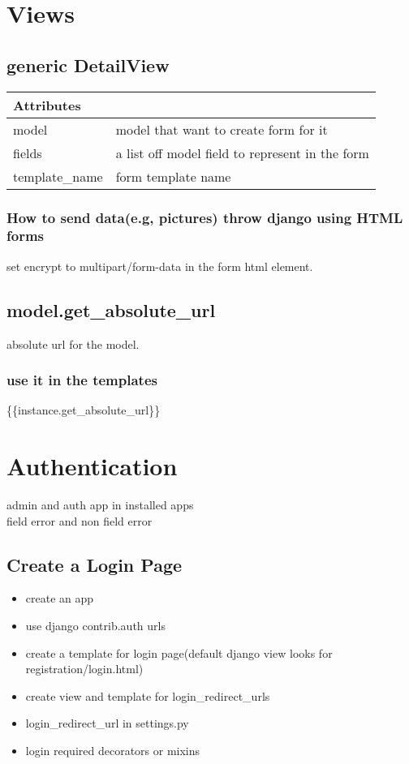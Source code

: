 \documentclass{article}
\begin{document}
	\section{Views}
		\subsection{generic DetailView}
			\begin{tabular}{ll}
				\hline
				Attributes & \\ \hline
				model & model that want to create form for it \\
				fields & a list off model field to represent in the form\\
				template\_name & form template name 
			\end{tabular}
			\subsubsection{How to send data(e.g, pictures) throw django using HTML forms}
				set encrypt to multipart/form-data in the form html element.
			\subsection{model.get\_absolute\_url}
				absolute url for the model.
				\subsubsection{use it in the templates}
					\{\{instance.get\_absolute\_url\}\}
	\section{Authentication}
	
		admin and auth app in installed apps\\
		field error and non field error
		
		\subsection{Create a Login Page}
			\begin{itemize}
				\item create an app
				\item use django contrib.auth urls
				\item create a template for login page(default django view looks for registration/login.html)
				\item create view and template for login\_redirect\_urls
				\item login\_redirect\_url in settings.py
				\item login required decorators or mixins
			\end{itemize}
			
\end{document}
